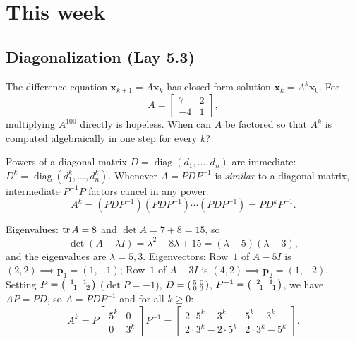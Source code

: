 \documentclass[10pt]{scrartcl}
\newcommand{\vv}[1]{\mathbf{#1}}
\begin{document}
\section{This week}

\subsection{Diagonalization (Lay 5.3)}

\begin{qbox}
  The difference equation $\vv x_{k+1}=A\vv x_k$ has closed-form solution $\vv x_k=A^k\vv x_0$. For
  \[
    A=\begin{bmatrix}7&2\\-4&1\end{bmatrix},
  \]
  multiplying $A^{100}$ directly is hopeless. When can $A$ be factored so that $A^k$ is computed algebraically in one step for every $k$?
\end{qbox}

Powers of a diagonal matrix $D=\operatorname{diag}(d_1,\dots,d_n)$ are immediate: $D^k=\operatorname{diag}(d_1^k,\dots,d_n^k)$. Whenever $A=PDP^{-1}$ is \emph{similar} to a diagonal matrix, intermediate $P^{-1}P$ factors cancel in any power:
\[
  A^k = (PDP^{-1})(PDP^{-1})\cdots(PDP^{-1}) = P D^k P^{-1}.
\]

\begin{example*}
  \begin{steps}
    \ii Eigenvalues: $\operatorname{tr} A=8$ and $\det A=7+8=15$, so
    \[
      \det(A-\lambda I)=\lambda^2-8\lambda+15=(\lambda-5)(\lambda-3),
    \]
    and the eigenvalues are $\lambda=5,3$.
    \ii Eigenvectors: Row~$1$ of $A-5I$ is $(2,2)\implies\vv p_1=(1,-1)$; Row~$1$ of $A-3I$ is $(4,2)\implies\vv p_2=(1,-2)$.
    \ii Setting $P=\begin{psmallmatrix}1&1\\-1&-2\end{psmallmatrix}$ ($\det P=-1$), $D=\begin{psmallmatrix}5&0\\0&3\end{psmallmatrix}$, $P^{-1}=\begin{psmallmatrix}2&1\\-1&-1\end{psmallmatrix}$, we have $AP=PD$, so $A=PDP^{-1}$ and for all $k\ge 0$:
    \[
      A^k = P\begin{bmatrix}5^k&0\\0&3^k\end{bmatrix}P^{-1}
      = \begin{bmatrix}2\cdot 5^k-3^k & 5^k-3^k\\ 2\cdot 3^k-2\cdot 5^k & 2\cdot 3^k-5^k\end{bmatrix}.
    \]
  \end{steps}
\end{example*}
\end{document}
